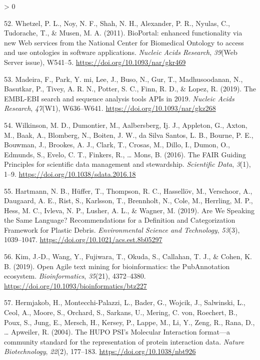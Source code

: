 \documentclass[
  12pt,
]{book}
\newlength{\cslhangindent}
\newenvironment{CSLReferences}[2] %
 {%
  \setlength{\parindent}{0pt}
  \ifodd #1 \everypar{\setlength{\hangindent}{\cslhangindent}}\ignorespaces\fi
  \ifnum #2 > 0
  \setlength{\parskip}{#2\baselineskip}
  \fi
 }%
 {}
\begin{document}
\begin{CSLReferences}{1}{0}
\leavevmode\hypertarget{ref-Whetzel2011}{}%
52. Whetzel, P. L., Noy, N. F., Shah, N. H., Alexander, P. R., Nyulas, C., Tudorache, T., \& Musen, M. A. (2011). {BioPortal: enhanced functionality via new Web services from the National Center for Biomedical Ontology to access and use ontologies in software applications.} \emph{Nucleic Acids Research}, \emph{39}(Web Server issue), W541--5. \url{https://doi.org/10.1093/nar/gkr469}

\leavevmode\hypertarget{ref-Madeira2019}{}%
53. Madeira, F., Park, Y. mi, Lee, J., Buso, N., Gur, T., Madhusoodanan, N., Basutkar, P., Tivey, A. R. N., Potter, S. C., Finn, R. D., \& Lopez, R. (2019). {The EMBL-EBI search and sequence analysis tools APIs in 2019}. \emph{Nucleic Acids Research}, \emph{47}(W1), W636--W641. \url{https://doi.org/10.1093/nar/gkz268}

\leavevmode\hypertarget{ref-Wilkinson2016}{}%
54. Wilkinson, M. D., Dumontier, M., Aalbersberg, Ij. J., Appleton, G., Axton, M., Baak, A., Blomberg, N., Boiten, J. W., da Silva Santos, L. B., Bourne, P. E., Bouwman, J., Brookes, A. J., Clark, T., Crosas, M., Dillo, I., Dumon, O., Edmunds, S., Evelo, C. T., Finkers, R., \ldots{} Mons, B. (2016). {The FAIR Guiding Principles for scientific data management and stewardship}. \emph{Scientific Data}, \emph{3}(1), 1--9. \url{https://doi.org/10.1038/sdata.2016.18}

\leavevmode\hypertarget{ref-Hartmann2019}{}%
55. Hartmann, N. B., Hüffer, T., Thompson, R. C., Hassellöv, M., Verschoor, A., Daugaard, A. E., Rist, S., Karlsson, T., Brennholt, N., Cole, M., Herrling, M. P., Hess, M. C., Ivleva, N. P., Lusher, A. L., \& Wagner, M. (2019). {Are We Speaking the Same Language? Recommendations for a Definition and Categorization Framework for Plastic Debris}. \emph{Environmental Science and Technology}, \emph{53}(3), 1039--1047. \url{https://doi.org/10.1021/acs.est.8b05297}

\leavevmode\hypertarget{ref-Kim2019}{}%
56. Kim, J.-D., Wang, Y., Fujiwara, T., Okuda, S., Callahan, T. J., \& Cohen, K. B. (2019). {Open Agile text mining for bioinformatics: the PubAnnotation ecosystem}. \emph{Bioinformatics}, \emph{35}(21), 4372--4380. \url{https://doi.org/10.1093/bioinformatics/btz227}

\leavevmode\hypertarget{ref-Hermjakob2004}{}%
57. Hermjakob, H., Montecchi-Palazzi, L., Bader, G., Wojcik, J., Salwinski, L., Ceol, A., Moore, S., Orchard, S., Sarkans, U., Mering, C. von, Roechert, B., Poux, S., Jung, E., Mersch, H., Kersey, P., Lappe, M., Li, Y., Zeng, R., Rana, D., \ldots{} Apweiler, R. (2004). {The HUPO PSI's Molecular Interaction format---a community standard for the representation of protein interaction data}. \emph{Nature Biotechnology}, \emph{22}(2), 177--183. \url{https://doi.org/10.1038/nbt926}


\end{CSLReferences}
\end{document}
